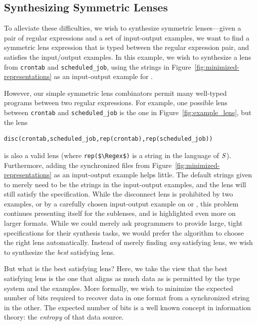 \documentclass[acmsmall,screen,anonymous]{acmart}
\begin{document}
\subsection{Synthesizing Symmetric Lenses}

To alleviate these difficulties, we wish to synthesize symmetric lenses---given
a pair of regular expressions and a set of input-output examples, we want to
find a symmetric lens expression that is typed between the regular expression
pair, and satisfies the input/output examples. In this example, we wish to
synthesize a lens from \lstinline{crontab} and \lstinline{scheduled_job}, using
the strings in Figure~\ref{fig:minimized-representations} as an input-output
example for \CreateR.

However, our simple symmetric lens combinators permit many well-typed programs
between two regular expressions. For example, one possible lens between
\lstinline{crontab} and \lstinline{scheduled_job} is the one in
Figure~\ref{fig:example_lens}, but the lens
%
\begin{lstlisting}
disc(crontab,scheduled_job,rep(crontab),rep(scheduled_job))
\end{lstlisting}
%
is also a valid lens (where \lstinline{rep($\Regex$)} is a string in the
language of $\mathit{S}$). Furthermore, adding the synchronized files from
Figure~\ref{fig:minimized-representations} as an input-output example helps
little. The default strings given to \Disconnect merely need to be the strings
in the input-output examples, and the lens will still satisfy the specification.
While the disconnect lens is prohibited by two examples, or by a carefully
chosen input-output example on \PutR or \PutL, this problem continues presenting
itself for the sublenses, and is highlighted even more on larger formats. While
we could merely ask programmers to provide large, tight specifications for their
synthesis tasks, we would prefer the algorithm to choose the right lens
automatically. Instead of merely finding \emph{any} satisfying lens, we wish to
synthesize the \emph{best} satisfying lens.

But what is the best satisfying lens? Here, we take the view that the best satisfying lens is the
one that aligns as much data as is permitted by the type system and the
examples. More formally, we wish to minimize the expected number of bits
required to recover data in one format from a synchronized string in the other.
The expected number of bits is a well known concept in information theory: the
\emph{entropy} of that data source.
\end{document}

